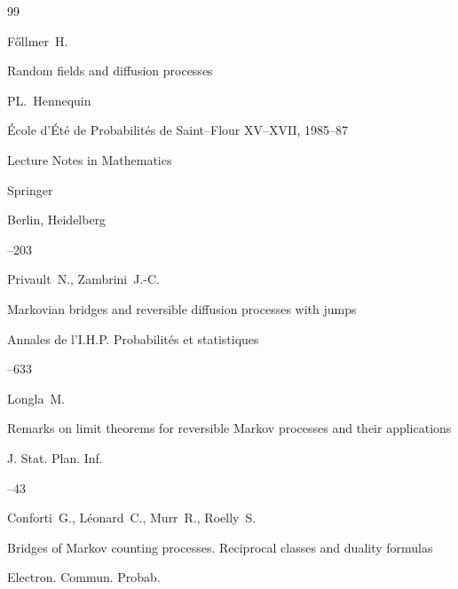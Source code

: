 \begin{thebibliography}{99}

\by F\H{o}llmer~H.

\paper Random fields and diffusion processes

\eds PL.~Hennequin  

\inbook \'Ecole d'\'Et\'e de Probabilit\'es de Saint--Flour XV--XVII\rm, 1985–87

\serial Lecture Notes in Mathematics


\publ Springer

\publaddr Berlin, Heidelberg

--203 








\by Privault~N., Zambrini~J.-C.

\paper Markovian bridges and reversible diffusion processes with jumps

\jour Annales de l'I.H.P. Probabilit\'es et statistiques 



–633 






\by Longla~M.

\paper Remarks on limit theorems for reversible Markov processes and their applications

\jour J. Stat. Plan. Inf.


--43 








\by Conforti~G., L\'eonard~C., Murr~R., Roelly~S.

\paper Bridges of Markov counting processes. Reciprocal classes and duality formulas

\jour Electron. Commun. Probab.



\end{thebibliography}

